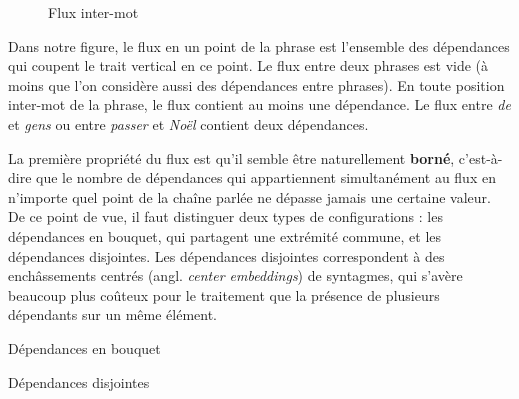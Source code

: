 {\begin{figure}[H]
\begin{tikzpicture}
    \end{tikzpicture}
    \caption{Flux inter-mot\label{fig:}}
    \end{figure}

    Dans notre figure, le flux en un point de la phrase est l’ensemble des dépendances qui coupent le trait vertical en ce point. Le flux entre deux phrases est vide (à moins que l’on considère aussi des dépendances entre phrases). En toute position inter-mot de la phrase, le flux contient au moins une dépendance. Le flux entre \textit{de} et \textit{gens} ou entre \textit{passer} et \textit{Noël} contient deux dépendances.

    La première propriété du flux est qu’il semble être naturellement \textbf{borné}, c’est-à-dire que le nombre de dépendances qui appartiennent simultanément au flux en n’importe quel point de la chaîne parlée ne dépasse jamais une certaine valeur. De ce point de vue, il faut distinguer deux types de configurations : les dépendances en bouquet, qui partagent une extrémité commune, et les dépendances disjointes. Les dépendances disjointes correspondent à des enchâssements centrés (angl. \textit{center embeddings}) de syntagmes, qui s’avère beaucoup plus coûteux pour le traitement que la présence de plusieurs dépendants sur un même élément.


    \ea
    \ea Dépendances en bouquet\\
    \ex Dépendances disjointes\\
    \z
    \z

}
